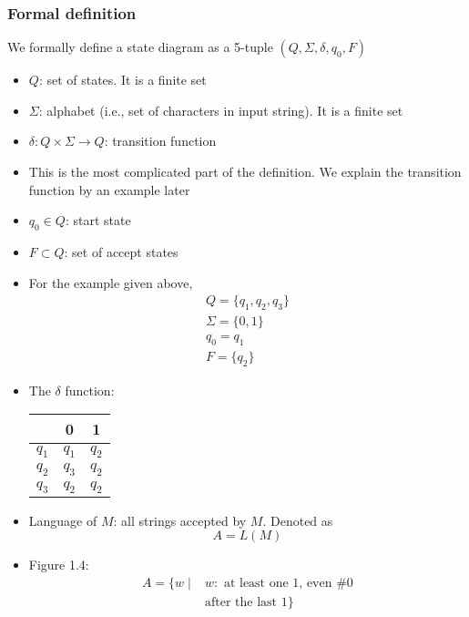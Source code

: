 \begin{frame}[allowframebreaks] \frametitle{Formal definition}
We formally define a state diagram as a 5-tuple $(Q,\Sigma, \delta, q_0, F)$
  \begin{itemize}

\item $Q$: set of states. It is a \alert{finite} set
\item $\Sigma$: alphabet (i.e., set of characters in input string). It is a finite set
\item $\delta: Q \times \Sigma \rightarrow Q$: transition function
\item [] This is the most complicated part of the definition. We explain the transition function by an example
  later
\item $q_0 \in Q$: start state
\item $F \subset Q$: set of accept states

\item For the example given above,
\begin{gather*}
  Q=\{q_1,q_2, q_3\}\\
\Sigma=\{0,1\}\\
q_0 = q_1 \\
F=\{q_2\}
\end{gather*}
\item The $\delta$ function:
  \begin{center}
  \begin{tabular}{c|cc}
& 0 & 1\\ \hline
$q_1$ & $q_1$ & $q_2$\\
$q_2$ & $q_3$ & $q_2$\\
$q_3$ & $q_2$ & $q_2$
  \end{tabular}
\end{center}
\item Language of $M$: all strings accepted by $M$. 
Denoted as
\begin{equation*}
A=L(M)
\end{equation*}
\item Figure 1.4:
  \begin{equation*}
    \begin{split}
    A=\{
w \mid & w: \text{ at least one 1, even \# 0} \\
& \text{after the last 1}\}
\end{split}
  \end{equation*}
\end{itemize}
\end{frame}

